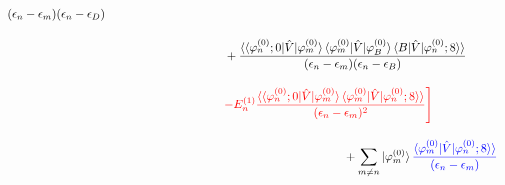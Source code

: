 \begin{align}
{    {(\epsilon_n-\epsilon_m)(\epsilon_n-\epsilon_D)}}\nn[10pt]
    &\hspace{100pt}
    +{\frac{\langle\braket{\varphi^{(0)}_{n};0|\hat{V}|\varphi^{(0)}_m}
    \langle{\varphi^{(0)}_{m}|\hat{V}|\varphi^{(0)}_B}\rangle
    \braket{B|\hat{V}|\varphi^{(0)}_n;8}\rangle}
    {(\epsilon_n-\epsilon_m)(\epsilon_n-\epsilon_B)}}\nn[10pt]
    &\hspace{100pt}
    \textcolor{red}{-E^{(1)}_n
    \frac{\langle\braket{\varphi^{(0)}_{n};0|\hat{V}|\varphi^{(0)}_m}
    \braket{\varphi^{(0)}_{m}|\hat{V}|\varphi^{(0)}_n;8}\rangle}{(\epsilon_n-\epsilon_m)^2}
    \Biggr]}
    \nn[10pt]
    &\hspace{200pt}+
    \sum_{m\neq n}\ket{\varphi^{(0)}_m}
    \textcolor{blue}{
    \frac{\braket{\varphi^{(0)}_{m}|\hat{V}|\varphi^{(0)}_n;8}\rangle}{(\epsilon_n-\epsilon_m)}}
\end{align}



